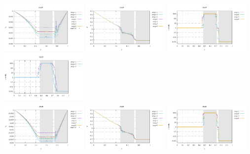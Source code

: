 \begin{center}
\includegraphics[width=4.25cm]{python_codes/fieldstone_41/results/exp3/33x33/profile_v.pdf}
\includegraphics[width=4.25cm]{python_codes/fieldstone_41/results/exp3/33x33/profile_p.pdf}
\includegraphics[width=4.25cm]{python_codes/fieldstone_41/results/exp3/33x33/profile_eta_elemental.pdf}
\includegraphics[width=4.25cm]{python_codes/fieldstone_41/results/exp3/33x33/profile_eta_nodal.pdf}\\
\includegraphics[width=4.25cm]{python_codes/fieldstone_41/results/exp3/49x49/profile_v.pdf}
\includegraphics[width=4.25cm]{python_codes/fieldstone_41/results/exp3/49x49/profile_p.pdf}
\includegraphics[width=4.25cm]{python_codes/fieldstone_41/results/exp3/49x49/profile_eta_elemental.pdf}

\end{center}
